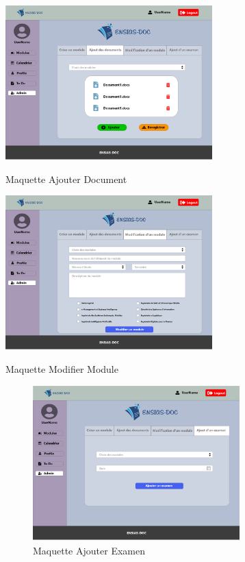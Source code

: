 \documentclass{article}
\begin{document}
{ \begin{minipage}[c]{.46\linewidth}
     \begin{center}
      \vspace{1cm}
             \includegraphics[width=8cm]{Admin-2 (1).png}
             \caption{Maquette Ajouter Document}
             \label{fig:Maquette Ajouter Document}
         \end{center}
   \end{minipage} \hfill
   \begin{minipage}[H]{.46\linewidth}
    \begin{center}
    \vspace{1cm}
            \includegraphics[width=8cm]{Admin-3 (1).png}
            \caption{Maquette Modifier Module}
            \label{fig: Maquette Modifier Module}
        \end{center}
 \end{minipage}
 
 \begin{figure}[H]
    \center
    \includegraphics[width=8cm,height=6cm]{Admin-4.png}
    \caption{ Maquette Ajouter Examen}
    \label{fig:Maquette Ajouter Examen.}
\end{figure}

}
\end{document}
